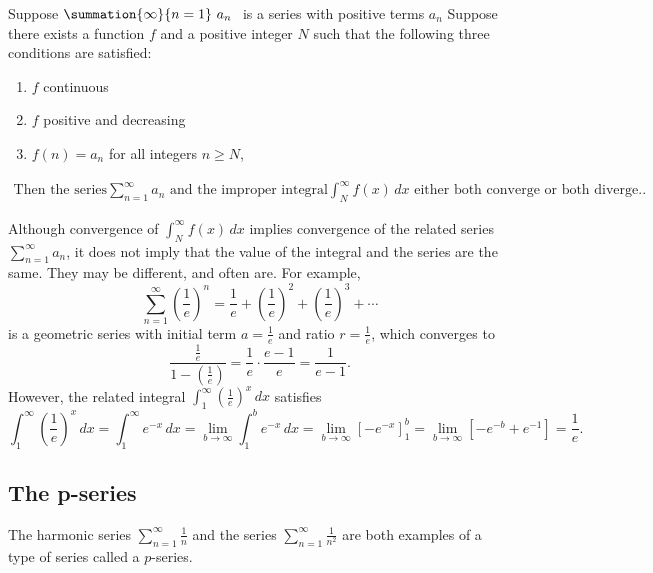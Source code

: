 \documentclass{report}
\begin{document}
    \begin{thrm}
        Suppose  $\summation{\infty}{n=1}\ a_{n}\  $ is a series with positive terms  $a_{n}$ Suppose there exists a function  $f $
  and a positive integer  $N$ 
  such that the following three conditions are satisfied:
        \begin{enumerate}
            \item \( f \) continuous
            \item \( f \) positive and decreasing
            \item \( f(n) = a_n \) for all integers \( n \geq N \),
        \end{enumerate}
        \begin{align*}
            \text{Then the series} \sum_{n=1}^{\infty} a_n \text{ and the improper integral} \int_{N}^{\infty} f(x) \, dx \text{ either both converge or both diverge.}
        .\end{align*}

    \end{thrm}
    \bigbreak \noindent 
    Although convergence of \( \int_{N}^{\infty} f(x) \, dx \)
    implies convergence of the related series \( \sum_{n=1}^{\infty} a_n \),
    it does not imply that the value of the integral and the series are the same. They may be different, and often are. For example,
    \[
    \sum_{n=1}^{\infty} \left(\frac{1}{e}\right)^n = \frac{1}{e} + \left(\frac{1}{e}\right)^2 + \left(\frac{1}{e}\right)^3 + \cdots
    \]
    is a geometric series with initial term \( a=\frac{1}{e} \)
    and ratio \( r=\frac{1}{e} \),
    which converges to
    \[
    \frac{\frac{1}{e}}{1-\left(\frac{1}{e}\right)} = \frac{1}{e} \cdot \frac{e-1}{e} = \frac{1}{e-1}.
    \]
    However, the related integral \( \int_{1}^{\infty} \left(\frac{1}{e}\right)^x \, dx \)
    satisfies
    \[
    \int_{1}^{\infty} \left(\frac{1}{e}\right)^x \, dx = \int_{1}^{\infty} e^{-x} \, dx = \lim_{b \to \infty} \int_{1}^{b} e^{-x} \, dx = \lim_{b \to \infty} \left[-e^{-x}\right]_{1}^{b} = \lim_{b \to \infty} \left[-e^{-b} + e^{-1}\right] = \frac{1}{e}.
    \]


    \pagebreak 
    \subsection*{The p-series}
    \bigbreak \noindent 
    The harmonic series \( \sum_{n=1}^{\infty} \frac{1}{n} \)
    and the series \( \sum_{n=1}^{\infty} \frac{1}{n^2} \)
    are both examples of a type of series called a \( p \)-series.
\end{document}

